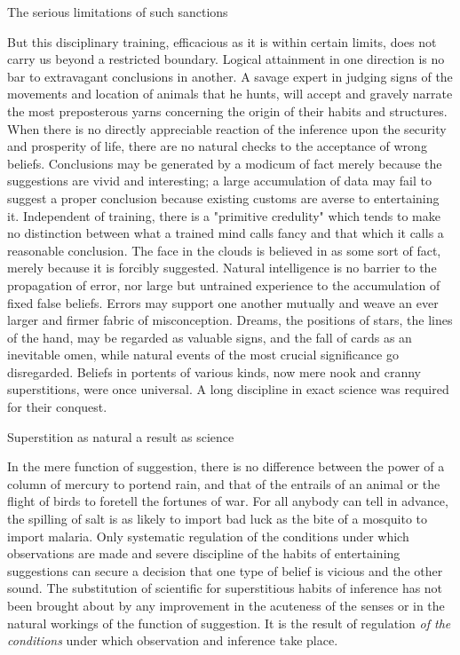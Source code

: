 \documentclass[letterpaper]{book}
\begin{document}
The serious limitations of such sanctions

But this disciplinary training, efficacious as it is within certain
limits, does not carry us beyond a restricted boundary. Logical
attainment in one direction is no bar to extravagant conclusions in
another. A savage expert in judging signs of the movements and location
of animals that he hunts, will accept and gravely narrate the most
preposterous yarns concerning the origin of their habits and structures.
When there is no directly appreciable reaction of the inference upon the
security and prosperity of life, there are no natural checks to the
acceptance of wrong beliefs. Conclusions may be generated by a modicum
of fact merely because the suggestions are vivid and interesting; a
large accumulation of data may fail to suggest a proper conclusion
because existing customs are averse to entertaining it. Independent of
training, there is a "primitive
credulity"
which tends to make no distinction between what a trained mind calls
fancy and that which it calls a reasonable conclusion. The face in the
clouds is believed in as some sort of fact, merely because it is
forcibly suggested. Natural intelligence is no barrier to the
propagation of error, nor large but untrained experience to the
accumulation of fixed false beliefs. Errors may support one another
mutually and weave an ever larger and firmer fabric of misconception.
Dreams, the positions of stars, the lines of the hand, may be regarded
as valuable signs, and the fall of cards as an inevitable omen, while
natural events of the most crucial significance go disregarded. Beliefs
in portents of various kinds, now mere nook and cranny superstitions,
were once universal. A long discipline in exact science was required for
their conquest.



Superstition as natural a result as science

In the mere function of suggestion, there is no difference between the
power of a column of mercury to portend rain, and that of the entrails
of an animal or the flight of birds to foretell the fortunes of war. For
all anybody can tell in advance, the spilling of salt is as likely to
import bad luck as the bite of a mosquito to import malaria. Only
systematic regulation of the conditions under which observations are
made and severe discipline of the habits of entertaining suggestions can
secure a decision that one type of belief is vicious and the other
sound. The substitution of scientific for superstitious habits of
inference has not been brought about by any improvement in the acuteness
of the senses or in the natural workings of the function of suggestion.
It is the result of regulation \emph{of the conditions} under which
observation and inference take
place.
\end{document}
